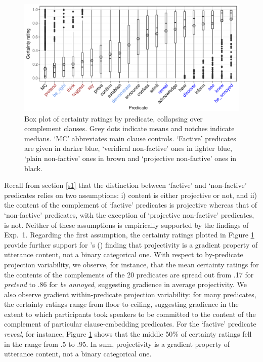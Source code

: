 \documentclass[11pt,fleqn]{article}
\newcommand{\6}{\mbox{$[\hspace*{-.6mm}[$}}
\newcommand{\9}{\mbox{$]\hspace*{-.6mm}]$}}
\newcommand{\citetpos}[1]{\citeauthor{#1}'s (\citeyear{#1})}
\begin{document}
\begin{figure}[H]
\centering

\includegraphics[width=.75\paperwidth]{../results/5-projectivity-no-fact/graphs/boxplot-projectivity}

\caption{Box plot of certainty ratings by predicate, collapsing over complement clauses. Grey dots indicate means and notches indicate medians. `MC' abbreviates main clause controls. `Factive' predicates are given in darker blue, `veridical non-factive' ones in lighter blue, `plain non-factive' ones in brown and `projective non-factive' ones in black.}
\label{f-projectivity}
\end{figure}

Recall from section \ref{s1} that the distinction between `factive' and `non-factive' predicates relies on two assumptions: i) content is either projective or not, and ii) the content of the complement of `factive' predicates is projective whereas that of `non-factive' predicates, with the exception of `projective non-factive' predicates, is not.  Neither of these assumptions is empirically supported by the findings of Exp.~1. Regarding the first assumption, the certainty ratings plotted in Figure \ref{f-projectivity} provide further support for  \citetpos{tbd-variability} finding that projectivity is a gradient property of utterance content, not a binary categorical one.  With respect to by-predicate projection variability, we observe, for instance, that the mean certainty ratings for the contents of the complements of the 20 predicates are spread out from .17 for {\em pretend} to .86 for {\em be annoyed}, suggesting gradience in average projectivity. We also observe gradient within-predicate projection variability: for many predicates, the certainty ratings range from floor to ceiling, suggesting gradience in the extent to which participants took speakers to be committed to the content of the complement of particular clause-embedding predicates. For the `factive' predicate {\em reveal}, for instance, Figure \ref{f-projectivity} shows that the middle 50\% of certainty ratings fell in the range from .5 to .95. In sum, projectivity is a gradient property of utterance content, not a binary categorical one.
\end{document}
